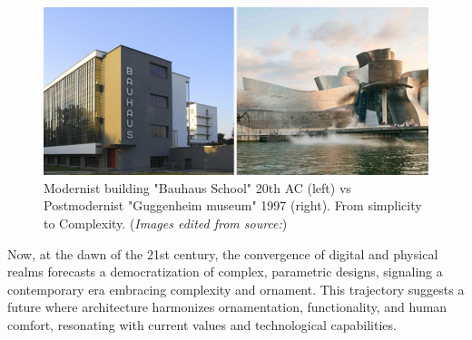      \begin{figure}[htb]
          \centering
          \includegraphics[width= \linewidth]{Images/modernism vs postmodernism}
          \caption{Modernist building "Bauhaus School" 20th AC (left) vs Postmodernist "Guggenheim museum" 1997 (right). From simplicity to Complexity. (\textit{Images edited from source:\cite{Arora2023}})}
          \label{fig:Modernismvspostmodernism}
        \end{figure}

Now, at the dawn of the 21st century, the convergence of digital and physical realms forecasts a democratization of complex, parametric designs, signaling a contemporary era embracing complexity and ornament\cite{Schwab2016}.
This trajectory suggests a future where architecture harmonizes ornamentation, functionality, and human comfort, resonating with current values and technological capabilities.


